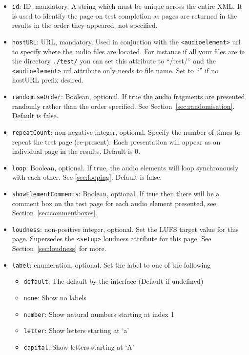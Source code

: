 \documentclass[11pt, oneside]{article}   	%
\begin{document}
        \begin{itemize}
            \item \texttt{id}: ID, mandatory. A string which must be unique across the entire XML. It is used to identify the page on test completion as pages are returned in the results in the order they appeared, not specified.
            \item \texttt{hostURL}: URL, mandatory. Used in conjuction with the \texttt{<audioelement>} url to specify where the audio files are located. For instance if all your files are in the directory \texttt{./test/} you can set this attribute to ``/test/'' and the \texttt{<audioelement>} url attribute only needs to file name. Set to ``'' if no hostURL prefix desired.
            \item \texttt{randomiseOrder}: Boolean, optional. If true the audio fragments are presented randomly rather than the order specified. See Section~\ref{sec:randomisation}. Default is false.
            \item \texttt{repeatCount}: non-negative integer, optional. Specify the number of times to repeat the test page (re-present). Each presentation will appear as an individual page in the results. Default is 0.
            \item \texttt{loop}: Boolean, optional. If true, the audio elements will loop synchronously with each other. See \ref{sec:looping}. Default is false.
            \item \texttt{showElementComments}: Boolean, optional. If true then there will be a comment box on the test page for each audio element presented, see Section~\ref{sec:commentboxes}.
            \item \texttt{loudness}: non-positive integer, optional. Set the LUFS target value for this page. Supersedes the \texttt{<setup>} loudness attribute for this page. See Section~\ref{sec:loudness} for more.
            \item \texttt{label}: enumeration, optional. Set the label to one of the following
            \begin{itemize}
            	\item \texttt{default}: The default by the interface (Default if undefined)
            	\item \texttt{none}: Show no labels
            	\item \texttt{number}: Show natural numbers starting at index 1
            	\item \texttt{letter}: Show letters starting at `a'
            	\item \texttt{capital}: Show letters starting at `A'

\end{itemize}
\end{itemize}
\end{document}
